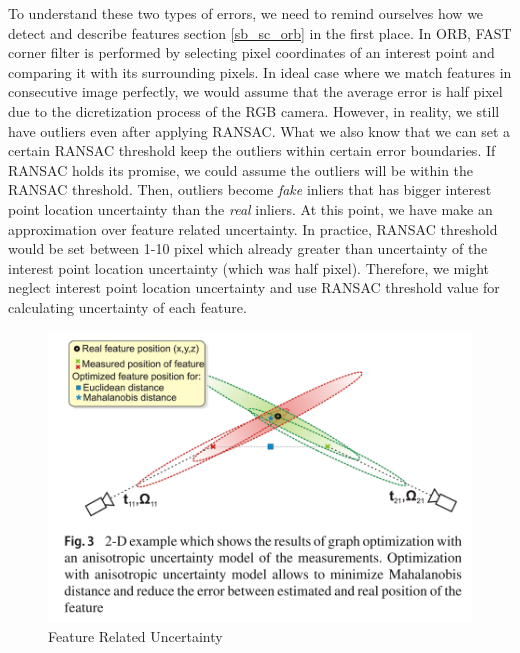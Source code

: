 \documentclass[a4paper]{report}
\numberwithin{figure}{section}
\begin{document}
To understand these two types of errors, we need to remind ourselves 
how we detect and describe features section \ref{sb_sc_orb} in the first place. 
In ORB, FAST corner filter is performed by selecting pixel coordinates of an 
interest point and comparing it with its surrounding pixels. In ideal case 
where we match features in consecutive image perfectly, we would assume that 
the average error is half pixel due to the dicretization process of the RGB camera. 
However, in reality, we still have outliers even after applying RANSAC. 
What we also know that we can set a certain RANSAC threshold keep the outliers 
within certain error boundaries. If RANSAC holds its promise, we could 
assume the outliers will be within the RANSAC threshold. Then, outliers 
become \textit{fake} inliers that has bigger interest point location uncertainty than 
the \textit{real} inliers. At this point, we have make an approximation over 
feature related uncertainty. In practice, RANSAC threshold would be set 
between 1-10 pixel which already greater than uncertainty of the interest point 
location uncertainty (which was half pixel). Therefore, we might neglect 
interest point location uncertainty and use RANSAC threshold value for 
calculating uncertainty of each feature.

\begin{figure}[H]
	\centering
  \includegraphics[width=0.7\linewidth,natwidth=640,natheight=640]
  {fig/ref_imgs/feature_related_uncertainty_one.png}
  \caption{Feature Related Uncertainty}
	\label{fig:feature_related_uncertainty_one}
\end{figure}
\end{document}

